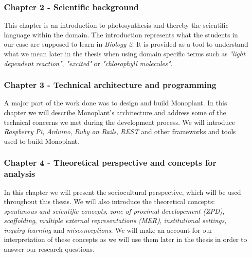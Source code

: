 \subsubsection*{Chapter 2 - Scientific background}
This chapter is an introduction to photosynthesis and thereby the scientific language within the domain. The introduction represents what the students in our case are supposed to learn in \emph{Biology 2}. It is provided as a tool to understand what we mean later in the thesis when using domain specific terms such as \emph{"light dependent reaction"}, \emph{"excited"} or \emph{"chlorophyll molecules"}.

\subsubsection*{Chapter 3 - Technical architecture and programming}
A major part of the work done was to design and build Monoplant. In this chapter we will describe Monoplant's architecture and address some of the technical concerns we met during the development process. We will introduce \emph{Raspberry Pi}, \emph{Arduino}, \emph{Ruby on Rails}, \emph{REST} and other frameworks and tools used to build Monoplant.

\subsubsection*{Chapter 4 - Theoretical perspective and concepts for analysis}

In this chapter we will present the sociocultural perspective, which will be used throughout this thesis. We will also introduce the theoretical concepts: \emph{spontanous and scientific concepts}, \emph{zone of proximal developement (ZPD)}, \emph{scaffolding}, \emph{multiple external representations (MER)}, \emph{institutional settings}, \emph{inquiry learning} and \emph{misconceptions}. We will make an account for our interpretation of these concepts as we will use them later in the thesis in order to answer our research questions. 

